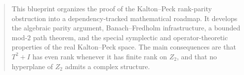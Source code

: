 \begin{abstract}
This blueprint organizes the proof of the Kalton--Peck rank-parity obstruction into a
dependency-tracked mathematical roadmap.  It develops the algebraic parity argument,
Banach--Fredholm infrastructure, a bounded mod-$2$ path theorem, and the special symplectic and
operator-theoretic properties of the real Kalton--Peck space.  The main consequences are that
$T^2+I$ has even rank whenever it has finite rank on $Z_2$, and that no hyperplane of $Z_2$
admits a complex structure.
\end{abstract}
